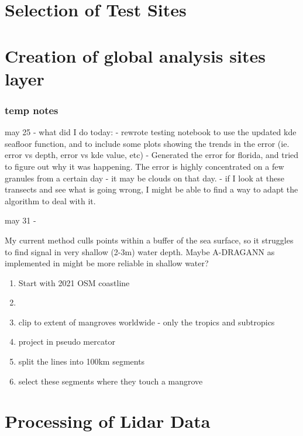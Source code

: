 \section{Selection of Test Sites}
\section{Creation of global analysis sites layer}
\subsubsection*{temp notes}

may 25 - what did I do today:
- rewrote testing notebook to use the updated kde seafloor function, and to include some plots showing the trends in the error (ie. error vs depth, error vs kde value, etc)
- Generated the error for florida, and tried to figure out why it was happening. The error is highly concentrated on a few granules from a certain day - it may be clouds on that day.
- if I look at these transects and see what is going wrong, I might be able to find a way to adapt the algorithm to deal with it.

may 31 -

My current method culls points within a buffer of the sea surface, so it struggles to find signal in very shallow (2-3m) water depth. Maybe A-DRAGANN as implemented in \cite{Cao2021} might be more reliable in shallow water?
\begin{enumerate}
    \color{orange}
    \item Start with 2021 OSM coastline
    \item 
    \item clip to extent of mangroves worldwide - only the tropics and subtropics
    \item project in pseudo mercator
    \item split the lines into 100km segments
    \item select these segments where they touch a mangrove 
\end{enumerate}


\section{Processing of Lidar Data}

